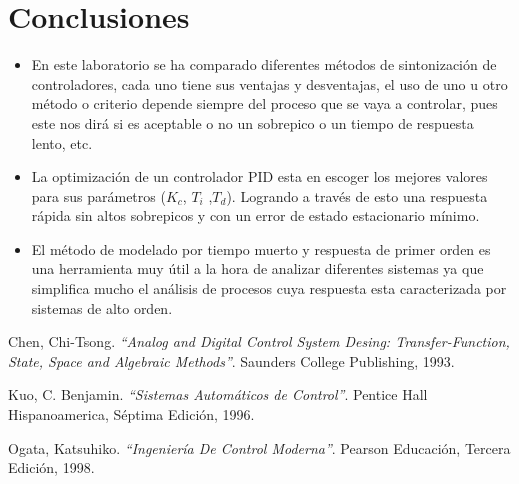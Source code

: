 \documentclass[twocolumn]{IEEEtran}
\begin{document}
\section{Conclusiones}
\begin{itemize}
 \item En este laboratorio se ha comparado diferentes métodos de sintonización de controladores, cada uno tiene sus ventajas y desventajas, el uso de uno u otro método o criterio  depende siempre del proceso que se vaya a controlar, pues este nos dirá si es aceptable o no un sobrepico o un tiempo de respuesta lento, etc.
 \item La optimización de un controlador PID esta en escoger los mejores valores para sus parámetros ($K_c$, $T_i$ ,$T_d$). Logrando a través de esto una respuesta rápida sin altos sobrepicos y con un error de estado estacionario mínimo.
 \item El método de modelado por tiempo muerto y  respuesta de primer orden es una herramienta  muy útil a la hora de analizar diferentes sistemas ya que simplifica mucho el análisis de procesos cuya respuesta esta caracterizada por sistemas de alto orden.
 \end{itemize}


\begin{thebibliography}{99}

 Chen, Chi-Tsong.
{\em "`Analog and Digital Control System Desing: Transfer-Function, State, Space and Algebraic Methods"'}.
Saunders College Publishing, 1993.

 Kuo, C. Benjamin.
{\em "`Sistemas Automáticos de Control"'}.
Pentice Hall Hispanoamerica, Séptima Edición, 1996.

 Ogata, Katsuhiko.
{\em "`Ingeniería De Control Moderna"'}.
Pearson Educación, Tercera Edición, 1998.

\end{thebibliography}
\end{document}
